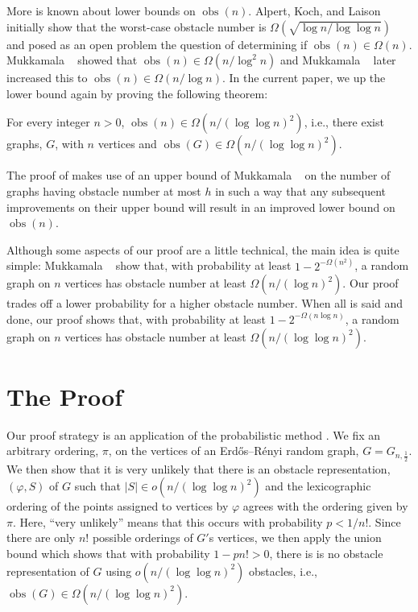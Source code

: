 \documentclass{patmorin}
\DeclareMathOperator{\obs}{obs}
\begin{document}
More is known about lower bounds on $\obs(n)$.  Alpert, Koch, and Laison \cite{alpert.koch.ea:obstacle}
initially show that the worst-case obstacle number is
$\Omega\left(\sqrt{\log n/\log\log n}\right)$ and posed as an open problem the question
of determining if $\obs(n)\in\Omega(n)$.
Mukkamala \etal\ \cite{mukkamala.pach.ea:graphs} showed that $\obs(n)\in
\Omega(n/\log^2 n)$ and Mukkamala \etal\ \cite{mukkamala.pach.ea:lower}
later increased this to $\obs(n)\in\Omega(n/\log n)$.  In the current paper,
we up the lower bound again by proving the following theorem:
\begin{thm}
  For every integer $n>0$, $\obs(n)\in\Omega(n/(\log\log n)^2)$, i.e., there
  exist graphs, $G$, with $n$ vertices and $\obs(G)\in\Omega(n/(\log\log
  n)^2)$.
\end{thm}

The proof of  makes use of an upper bound of Mukkamala \etal\
\cite[Theorem~1]{mukkamala.pach.ea:lower} on the number of graphs having
obstacle number at most $h$ in such a way that any subsequent improvements
on their upper bound will result in an improved lower bound on $\obs(n)$.

Although some aspects of our proof are a little technical, the main
idea is quite simple:  Mukkamala \etal\ \cite{mukkamala.pach.ea:lower}
show that, with probability at least $1-2^{-\Omega(n^2)}$, a random
graph on $n$ vertices has obstacle number at least $\Omega(n/(\log n)^2)$.
Our proof trades off a lower probability for a higher obstacle number.
When all is said and done, our proof shows that, with probability at least
$1-2^{-\Omega(n\log n)}$, a random graph on $n$ vertices has obstacle
number at least $\Omega(n/(\log\log n)^2)$.

\section{The Proof}

Our proof strategy is an application of the probabilistic method
\cite{alon.spencer:probabilistic}.  We fix an arbitrary ordering, $\pi$,
on the vertices of an Erd\H{o}s--R\'enyi random graph, $G=G_{n,\frac
12}$.  We then show that it is very unlikely that there is an obstacle
representation, $(\varphi, S)$ of $G$ such that $|S|\in o(n/(\log\log
n)^2)$ and the lexicographic ordering of the points assigned to
vertices by $\varphi$ agrees with the ordering given by $\pi$.  Here,
``very unlikely'' means that this occurs with probability $p<1/n!$.
Since there are only $n!$ possible orderings of $G'$s vertices, we then
apply the union bound which shows that with probability $1-pn!>0$, there
is is no obstacle representation of $G$ using $o(n/(\log\log n)^2)$ obstacles,
i.e., $\obs(G) \in \Omega(n/(\log\log n)^2)$.
\end{document}

